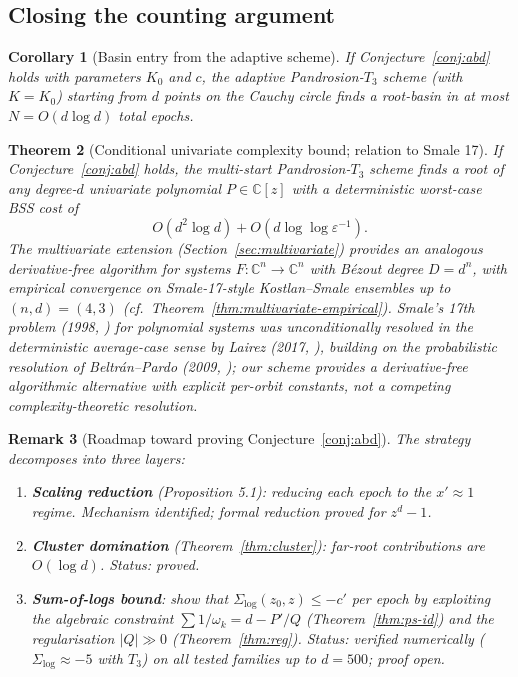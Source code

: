 \documentclass[11pt,a4paper]{article}
\newtheorem{theorem}{Theorem}[section]
\newtheorem{corollary}[theorem]{Corollary}
\newtheorem{remark}[theorem]{Remark}
\begin{document}
\subsection{Closing the counting argument}

\begin{corollary}[Basin entry from the adaptive scheme]
If Conjecture~\ref{conj:abd} holds with parameters $K_0$ and $c$, the adaptive Pandrosion-$T_3$ scheme (with $K = K_0$) starting from $d$ points on the Cauchy circle finds a root-basin in at most $N = O(d \log d)$ total epochs.
\end{corollary}

\begin{theorem}[Conditional univariate complexity bound; relation to Smale 17]\label{thm:smale17-cond}
If Conjecture~\ref{conj:abd} holds, the multi-start Pandrosion-$T_3$ scheme finds a root of any degree-$d$ univariate polynomial $P \in \mathbb{C}[z]$ with a deterministic worst-case BSS cost of
\begin{equation}
O(d^2 \log d) + O(d \log\log \varepsilon^{-1}).
\end{equation}
The multivariate extension (Section~\ref{sec:multivariate}) provides an analogous derivative-free algorithm for systems $F: \mathbb{C}^n \to \mathbb{C}^n$ with B\'ezout degree $D = d^n$, with empirical convergence on Smale-17-style Kostlan--Smale ensembles up to $(n, d) = (4, 3)$ (cf.\ Theorem~\ref{thm:multivariate-empirical}). Smale's 17th problem (1998, \cite{smale1998}) for polynomial systems was unconditionally resolved in the deterministic average-case sense by Lairez (2017, \cite{lairez}), building on the probabilistic resolution of Beltr\'an--Pardo (2009, \cite{beltranpardo}); our scheme provides a \emph{derivative-free algorithmic alternative} with explicit per-orbit constants, not a competing complexity-theoretic resolution.
\end{theorem}

\begin{remark}[Roadmap toward proving Conjecture~\ref{conj:abd}]
The strategy decomposes into three layers:
\begin{enumerate}
\item \textbf{Scaling reduction} (Proposition 5.1): reducing each epoch to the $x' \approx 1$ regime. \emph{Mechanism identified; formal reduction proved for $z^d - 1$.}
\item \textbf{Cluster domination} (Theorem~\ref{thm:cluster}): far-root contributions are $O(\log d)$. \emph{Status: proved.}
\item \textbf{Sum-of-logs bound}: show that $\Sigma_{\log}(z_0, z) \le -c'$ per epoch by exploiting the algebraic constraint $\sum 1/\omega_k = d - P'/Q$ (Theorem~\ref{thm:ps-id}) and the regularisation $|Q| \gg 0$ (Theorem~\ref{thm:reg}). \emph{Status: verified numerically ($\Sigma_{\log} \approx -5$ with $T_3$) on all tested families up to $d = 500$; proof open.}
\end{enumerate}
\end{remark}
\end{document}

